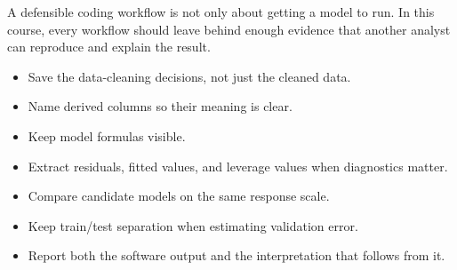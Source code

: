 A defensible coding workflow is not only about getting a model to run.  In this course, every workflow should leave behind enough evidence that another analyst can reproduce and explain the result.

\begin{itemize}
  \item Save the data-cleaning decisions, not just the cleaned data.
  \item Name derived columns so their meaning is clear.
  \item Keep model formulas visible.
  \item Extract residuals, fitted values, and leverage values when diagnostics matter.
  \item Compare candidate models on the same response scale.
  \item Keep train/test separation when estimating validation error.
  \item Report both the software output and the interpretation that follows from it.
\end{itemize}
